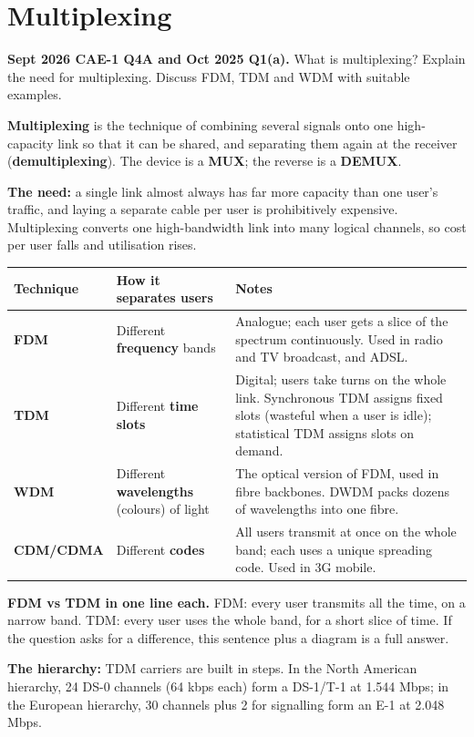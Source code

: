 \documentclass[11pt,a4paper]{article}
\begin{document}
\section{Multiplexing}

\begin{pyqbox}
\textbf{Sept 2026 CAE-1 Q4A and Oct 2025 Q1(a).} What is multiplexing? Explain the need for multiplexing. Discuss FDM, TDM and WDM with suitable examples.
\end{pyqbox}

\begin{solbox}
\textbf{Multiplexing} is the technique of combining several signals onto one high-capacity link so that it can be shared, and separating them again at the receiver (\textbf{demultiplexing}). The device is a \textbf{MUX}; the reverse is a \textbf{DEMUX}.

\textbf{The need:} a single link almost always has far more capacity than one user's traffic, and laying a separate cable per user is prohibitively expensive. Multiplexing converts one high-bandwidth link into many logical channels, so cost per user falls and utilisation rises.

\begin{center}\small
\begin{tabularx}{\textwidth}{>{\bfseries}p{} p{} X}
\toprule Technique & How it separates users & Notes\\
\midrule
FDM & Different \textbf{frequency} bands & Analogue; each user gets a slice of the spectrum continuously. Used in radio and TV broadcast, and ADSL.\\
TDM & Different \textbf{time slots} & Digital; users take turns on the whole link. Synchronous TDM assigns fixed slots (wasteful when a user is idle); statistical TDM assigns slots on demand.\\
WDM & Different \textbf{wavelengths} (colours) of light & The optical version of FDM, used in fibre backbones. DWDM packs dozens of wavelengths into one fibre.\\
CDM/CDMA & Different \textbf{codes} & All users transmit at once on the whole band; each uses a unique spreading code. Used in 3G mobile.\\
\bottomrule
\end{tabularx}
\end{center}

\begin{rememberbox}
\textbf{FDM vs TDM in one line each.} FDM: every user transmits all the time, on a narrow band. TDM: every user uses the whole band, for a short slice of time. If the question asks for a difference, this sentence plus a diagram is a full answer.
\end{rememberbox}

\textbf{The hierarchy:} TDM carriers are built in steps. In the North American hierarchy, 24 DS-0 channels (64 kbps each) form a DS-1/T-1 at 1.544 Mbps; in the European hierarchy, 30 channels plus 2 for signalling form an E-1 at 2.048 Mbps.
\end{solbox}
\end{document}

